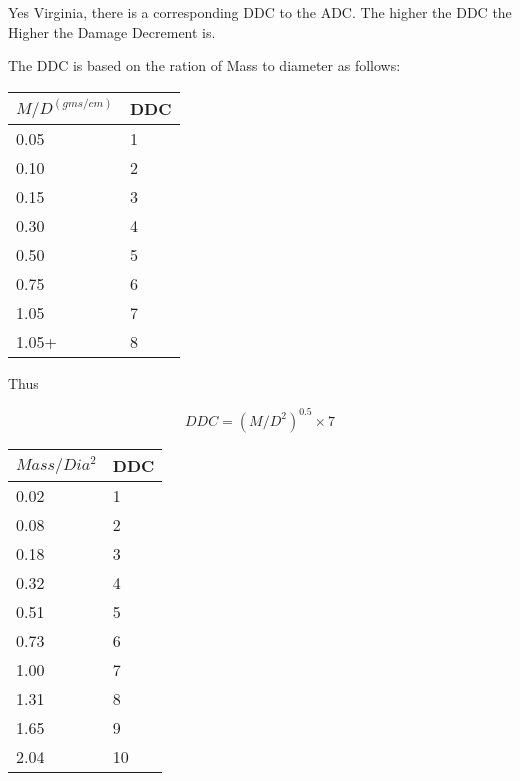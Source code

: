 Yes Virginia, there is a corresponding DDC to the ADC. The higher 
the DDC the Higher the Damage Decrement is.

The DDC is based on the ration of Mass to diameter as follows:

\begin{tabular}{||l|l||} \hline 
\(M/D^{(gms/cm)} \)	&	DDC \\ \hline 
0.05				& 1 \\
0.10       	        & 2  \\
0.15				& 3 \\
0.30				& 4 \\
0.50				& 5 \\
0.75				& 6 \\
1.05				& 7 \\
1.05+				& 8 \\ \hline 
\end{tabular}

Thus 

\[ DDC = ( M/{D^2} ) ^ 0.5  \times 7 \]

\begin{tabular}{||l|l||} \hline 
\(Mass/Dia^{2}\)    & DDC \\ \hline 
0.02			& 1 \\
0.08			& 2 \\
0.18			& 3 \\
0.32			& 4 \\
0.51			& 5 \\
0.73			& 6 \\
1.00			& 7 \\
1.31			& 8 \\
1.65			& 9 \\
2.04			& 10 \\ \hline 
\end{tabular}


